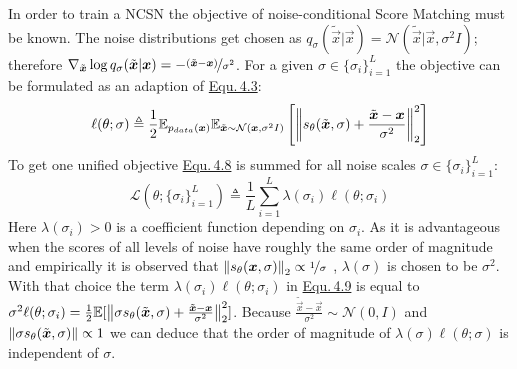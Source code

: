In order to train a NCSN the objective of noise-conditional Score Matching must be known. The noise distributions get chosen as $q_\sigma(\tilde{\vec{x}}|\vec{x})=\mathcal{N}(\tilde{\vec{x}}|\vec{x},\sigma^2I)$; therefore $\nabla_{\tilde{\vec{x}}}\log q_\sigma(\tilde{\vec{x}}|\vec{x})=-\nicefrac{(\tilde{\vec{x}}-\vec{x})}{\sigma^2}$. For a given $\sigma\in\{\sigma_i\}_{i=1}^L$ the objective can be formulated as an adaption of \hyperref[equ:4.3]{Equ.\,4.3}:
%
\begin{equation} \label{equ:4.8}
    \ell(\theta; \sigma)\triangleq\frac{1}{2}\mathbb{E}_{p_{data}(\vec{x})}\mathbb{E}_{\tilde{\vec{x}}\sim\mathcal{N}(\vec{x},\sigma^2I)}\left[\norm{s_\theta(\tilde{\vec{x}},\sigma)+\frac{\tilde{\vec{x}}-\vec{x}}{\sigma^2}}_2^2\right]
\end{equation}
% 
To get one unified objective \hyperref[equ:4.8]{Equ.\,4.8} is summed for all noise scales $\sigma\in\{\sigma_i\}_{i=1}^L$:
%
\begin{equation} \label{equ:4.9}
    \mathcal{L}(\theta;\{\sigma_i\}_{i=1}^L)\triangleq\frac{1}{L}\sum_{i=1}^L\lambda(\sigma_i)\ell(\theta;\sigma_i)
\end{equation}
%
Here $\lambda(\sigma_i)>0$ is a coefficient function depending on $\sigma_i$. As it is advantageous when the scores of all levels of noise have roughly the same order of magnitude and empirically it is observed that $\norm{s_\theta(\vec{x},\sigma)}_2\propto\nicefrac{1}{\sigma}$ \cite{score_2}, $\lambda(\sigma)$ is chosen to be $\sigma^2$. With that choice the term $\lambda(\sigma_i)\ell(\theta;\sigma_i)$ in \hyperref[equ:4.9]{Equ.\,4.9} is equal to $\sigma^2\ell(\theta;\sigma_i)=\frac{1}{2}\mathbb{E}[\norm{\sigma s_\theta(\tilde{\vec{x}},\sigma)+\frac{\tilde{\vec{x}}-\vec{x}}{\sigma^2}}_2^2]$. Because $\frac{\tilde{\vec{x}}-\vec{x}}{\sigma^2}\sim\mathcal{N}(0, I)$ and $\norm{\sigma s_\theta(\tilde{\vec{x}},\sigma)}\propto1$ we can deduce that the order of magnitude of $\lambda(\sigma)\ell(\theta;\sigma)$ is independent of $\sigma$.
%
